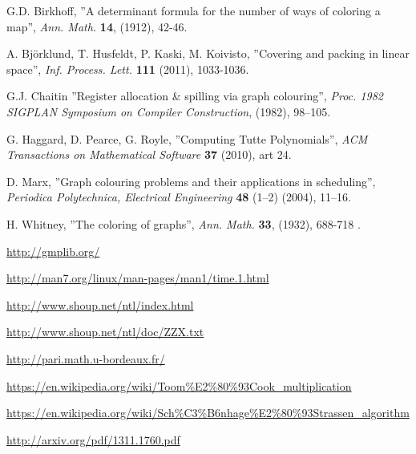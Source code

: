 \documentclass[a4paper]{article}
\begin{document}
\newpage
\begin{thebibliography}{9}
 G.D. Birkhoff, ''A determinant formula for the number of ways of coloring a map'', \textit{Ann. Math.} \textbf{14}, (1912), 42-46.

 A. Björklund, T. Husfeldt, P. Kaski, M. Koivisto, ''Covering and packing in linear space'', \textit{Inf. Process. Lett.} \textbf{111} (2011), 1033-1036.%

 G.J. Chaitin ''Register allocation \& spilling via graph colouring'', \textit{Proc. 1982 SIGPLAN Symposium on Compiler Construction}, (1982), 98–105.

 G. Haggard, D. Pearce, G. Royle, ''Computing Tutte Polynomials'', \textit{ACM Transactions on Mathematical Software} \textbf{37} (2010), art 24.

 D. Marx, ''Graph colouring problems and their applications in scheduling'', \textit{Periodica Polytechnica, Electrical Engineering} \textbf{48} (1–2) (2004), 11–16.

 H. Whitney, ''The coloring of graphs'', \textit{Ann. Math.} \textbf{33}, (1932), 688-718 .

 \url{http://gmplib.org/}


 \url{http://man7.org/linux/man-pages/man1/time.1.html}

 \url{http://www.shoup.net/ntl/index.html}

 \url{http://www.shoup.net/ntl/doc/ZZX.txt}

 \url{http://pari.math.u-bordeaux.fr/}

 \url{https://en.wikipedia.org/wiki/Toom\%E2\%80\%93Cook_multiplication}

 \url{https://en.wikipedia.org/wiki/Sch\%C3\%B6nhage\%E2\%80\%93Strassen_algorithm}

 \url{http://arxiv.org/pdf/1311.1760.pdf}

\end{thebibliography}
\end{document}
